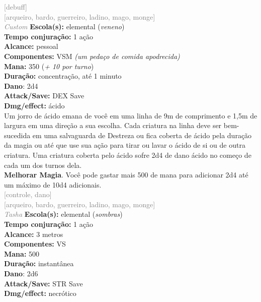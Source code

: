 \documentclass{RPG_Adventure}[2021/10/20]
\begin{document}
{\scriptsize \textcolor{gray}{[debuff]\\}}
{\scriptsize \textcolor{gray}{[arqueiro, bardo, guerreiro, ladino, mago, monge]\\}}
{\tiny \textcolor{gray}{\textit{Custom}}}\jump{}
{\small \t \textbf{Escola(s):} elemental (\textit{veneno})\\\t \textbf{Tempo conjuração:} 1 ação\\\t \textbf{Alcance:} pessoal\\\t \textbf{Componentes:} VSM \textit{(um pedaço de comida apodrecida)}\\\t \textbf{Mana:} 350 (\textit{+ 10 por turno})\\\t \textbf{Duração:} concentração, até 1 minuto\\\t \textbf{Dano}: 2d4\\\t \textbf{Attack/Save:} DEX Save\\\t \textbf{Dmg/effect:} ácido\\}
{\normalsize Um jorro de ácido emana de você em uma linha de 9m de comprimento e 1,5m de largura em uma direção a sua escolha. Cada criatura na linha deve ser bem-sucedida em uma salvaguarda de Destreza ou fica coberta de ácido pela duração da magia ou até que use sua ação para tirar ou lavar o ácido de si ou de outra criatura. Uma criatura coberta pelo ácido sofre 2d4 de dano ácido no começo de cada um dos turnos dela.\\\t \textbf{Melhorar Magia}. Você pode gastar mais 500 de mana para adicionar 2d4 até um máximo de 10d4 adicionais.\\}
{\scriptsize \textcolor{gray}{[controle, dano]\\}}
{\scriptsize \textcolor{gray}{[arqueiro, bardo, guerreiro, ladino, mago, monge]\\}}
{\tiny \textcolor{gray}{\textit{Tasha}}}\jump{}
{\small \t \textbf{Escola(s):} elemental (\textit{sombras})\\\t \textbf{Tempo conjuração:} 1 ação\\\t \textbf{Alcance:} 3 metros\\\t \textbf{Componentes:} VS\\\t \textbf{Mana:} 500\\\t \textbf{Duração:} instantânea\\\t \textbf{Dano}: 2d6\\\t \textbf{Attack/Save:} STR Save\\\t \textbf{Dmg/effect:} necrótico\\}
\end{document}
